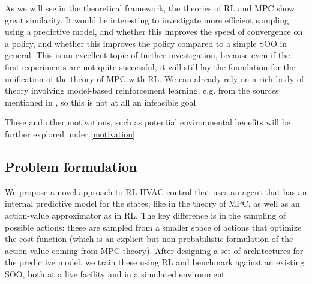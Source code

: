 \documentclass{article}
\theoremstyle{definition}
\theoremstyle{remark}
\begin{document}
As we will see in the theoretical framework, the theories of RL and MPC show great similarity. It would be interesting to investigate more efficient sampling using a predictive model, and whether this improves the speed of convergence on a policy, and whether this improves the policy compared to a simple SOO in general. This is an excellent topic of further investigation, because even if the first experiments are not quite successful, it will still lay the foundation for the unification of the theory of MPC with RL. We can already rely on a rich body of theory involving model-based reinforcement learning, e.g. from the sources mentioned in \cite{Seita_2019}, so this is not at all an infeasible goal

These and other motivations, such as potential environmental benefits will be further explored under \ref{motivation}.

\subsection{Problem formulation}

We propose a novel approach to RL HVAC control that uses an agent that has an internal predictive model for the states, like in the theory of MPC, as well as an action-value approximator as in RL. The key difference is in the sampling of possible actions: these are sampled from a smaller space of actions that optimize the cost function (which is an explicit but non-probabilistic formulation of the action value coming from MPC theory). After designing a set of architectures for the predictive model, we train these using RL and benchmark against an existing SOO, both at a live facility and in a simulated environment. 
\end{document}
